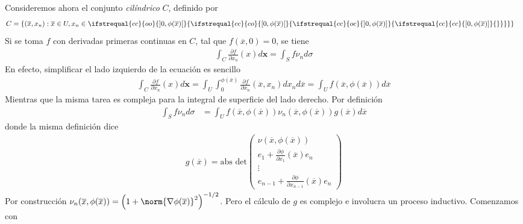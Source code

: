 \documentclass{report}
\theoremstyle{definition}
\theoremstyle{remark}
\newcommand{\leftOpenInterval}{\left]}
\newcommand{\rightOpenInterval}{\right[}
\newcommand{\leftClosedInterval}{\left[}
\newcommand{\rightClosedInterval}{\right]}
\newcommand{\interval}[3]{%
  \ifstrequal{#1}{oo}{%
    \leftOpenInterval #2, #3 \rightOpenInterval%
  }{%
    \ifstrequal{#1}{co}{%
      \leftClosedInterval #2, #3 \rightOpenInterval%
    }{%
      \ifstrequal{#1}{oc}{
        \leftOpenInterval #2, #3 \rightClosedInterval%
      }{%
        \ifstrequal{#1}{cc}{
          \leftClosedInterval #2, #3 \rightClosedInterval
        }{%
        }%
      }%
    }%
  }%
}
\begin{document}
  Consideremos ahora el conjunto \emph{cilíndrico} \(C\), definido por
  \begin{align}
    C
    &=
    \{(\overline{x}, x_n) : \overline{x} \in U, x_n \in \interval{cc}{0}{\phi(\overline{x})}\}
  \end{align}
  Si se toma \(f\) con derivadas primeras continuas en \(C\), tal que \(f(\overline{x}, 0) = 0\), se tiene
  \begin{align}
    \label{equation:divergenceTheoremInACylinder}
    \int_C \frac{\partial f}{\partial x_n}(x) d \mathbf{x}
    =
    \int_S f \nu_n d \sigma
  \end{align}
  En efecto, simplificar el lado izquierdo de la ecuación es sencillo
  \begin{align}
    \int_C \frac{\partial f}{\partial x_n}(x) d \mathbf{x}
    =
    \int_U
      \int_0^{\phi(\overline{x})}
        \frac{\partial f}{\partial x_n} (\overline{x}, x_n)
      d x_n
    d \overline{x}
    =
    \int_U
      f(\overline{x}, \phi(\overline{x}))
    d \overline{x}
  \end{align}
  Mientras que la misma tarea es compleja para la integral de superficie del lado derecho.
  Por definición
  \begin{align}
    \int_S f \nu_n d \sigma
    &=
    \int_U
      f(\overline{x}, \phi(\overline{x}))
      \nu_n(\overline{x}, \phi(\overline{x}))
      g(\overline{x})
    d \overline{x}
  \end{align}
  donde la misma definición dice
  \begin{align}
    g(\overline{x})
    =
    \text{abs det}
    \begin{pmatrix}
      \nu(\overline{x}, \phi(\overline{x}))
      \\
      e_1
      +
      \frac{\partial \phi}{\partial x_1}(\overline{x})
      e_n
      \\
      \vdots
      \\
      e_{n - 1}
      +
      \frac{\partial \phi}{\partial x_{n - 1}}(\overline{x})
      e_n
    \end{pmatrix}
  \end{align}
  Por construcción
  \(
    \nu_n (\overline{x}, \phi(\overline{x}))
    =
    \left(1 + \norm{\nabla \phi (\overline{x})}^2\right)^{- 1 / 2}
  \).
  Pero el cálculo de \(g\) es complejo e involucra un proceso inductivo.
  Comenzamos con
\end{document}
